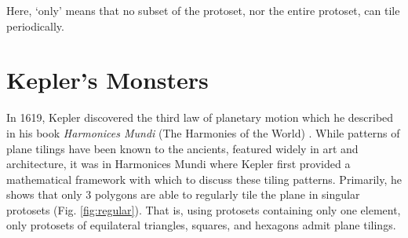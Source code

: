 \documentclass[
  oneside,
  11pt, a4paper,
  footinclude=true,
  headinclude=true,
  cleardoublepage=empty
]{scrbook}
\begin{document}
Here, `only' means that no subset of the protoset, nor the entire protoset, can tile periodically. 


\section{Kepler's Monsters} 
In 1619, Kepler discovered the third law of planetary motion which he described in his book \textit{Harmonices Mundi} (The Harmonies of the World) \cite{Kepler1997}. While patterns of plane tilings have been known to the ancients, featured widely in art and architecture, it was in Harmonices Mundi where Kepler first provided a mathematical framework with which to discuss these tiling patterns. Primarily, he shows that only 3 polygons are able to regularly tile the plane in singular protosets (Fig. \ref{fig:regular}). That is, using protosets containing only one element, only protosets of equilateral triangles, squares, and hexagons admit plane tilings. 
\end{document}
